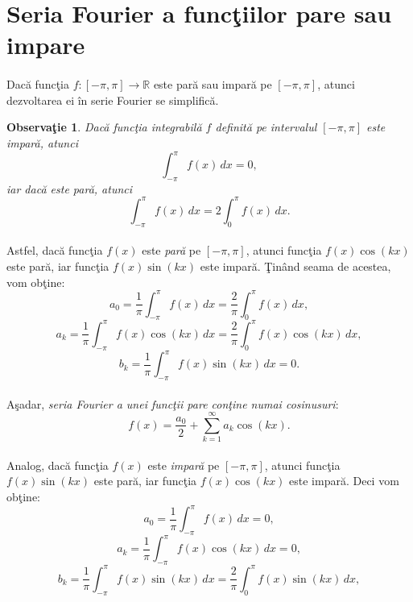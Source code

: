 \documentclass[a4paper,openany,12pt]{report}
\newtheorem{notice}{Observa\c tie}[section]
\begin{document}
\section{Seria Fourier a func\c tiilor pare sau impare}
\paragraph*{} Dac\u a func\c tia $f:[-\pi,\pi]\rightarrow\mathbb{R}$ este par\u a sau impar\u a pe $[-\pi, \pi]$, atunci dezvoltarea ei \^ in serie Fourier se simplific\u a. 
\begin{notice}Dac\u a func\c tia integrabil\u a $f$ definit\u a pe intervalul $[-\pi, \pi]$ este impar\u a, atunci 
\begin{equation*}
\int_{-\pi}^{\pi}f(x)\, dx=0,
\end{equation*} 
iar dac\u a este par\u a, atunci 
\begin{equation*}
\int_{-\pi}^{\pi}f(x)\, dx=2\int_{0}^{\pi}f(x)\, dx.
\end{equation*}
\end{notice}
\paragraph*{}Astfel, dac\u a func\c tia $f(x)$ este \textit{par\u a} pe $[-\pi, \pi]$, atunci func\c tia $f(x)\cos(kx)$ este par\u a, iar func\c tia $f(x)\sin(kx)$ este impar\u a. \c Tin\^ and seama de acestea, vom ob\c tine:
\begin{equation*}
a_0=\frac{1}{\pi}\int_{-\pi}^{\pi}f(x)\, dx =\frac{2}{\pi}\int_0^{\pi}f(x)\, dx,
\end{equation*}
\begin{equation*}
a_k=\frac{1}{\pi}\int_{-\pi}^{\pi}f(x)\cos(kx)\, dx =\frac{2}{\pi}\int_0^{\pi}f(x)\cos(kx)\, dx,
\end{equation*}
\begin{equation*}
b_k=\frac{1}{\pi}\int_{-\pi}^{\pi}f(x)\sin(kx)\, dx = 0.
\end{equation*}
\paragraph*{}A\c sadar, \textit{seria Fourier a unei func\c tii pare con\c tine numai cosinusuri}:
\begin{equation*}
f(x)=\frac{a_0}{2}+\sum_{k=1}^\infty a_k \cos(kx).
\end{equation*}
\paragraph*{}Analog, dac\u a func\c tia $f(x)$ este \textit{impar\u a} pe $[-\pi, \pi]$, atunci func\c tia $f(x)\sin(kx)$ este par\u a, iar  func\c tia $f(x)\cos(kx)$ este impar\u a. Deci vom ob\c tine:
\begin{equation*}
a_0=\frac{1}{\pi}\int_{-\pi}^{\pi}f(x)\, dx =0,
\end{equation*}
\begin{equation*}
a_k=\frac{1}{\pi}\int_{-\pi}^{\pi}f(x)\cos(kx)\, dx =0,
\end{equation*}
\begin{equation*}
b_k=\frac{1}{\pi}\int_{-\pi}^{\pi}f(x)\sin(kx)\, dx = \frac{2}{\pi}\int_0^{\pi}f(x)\sin(kx)\, dx,
\end{equation*}
\end{document}
